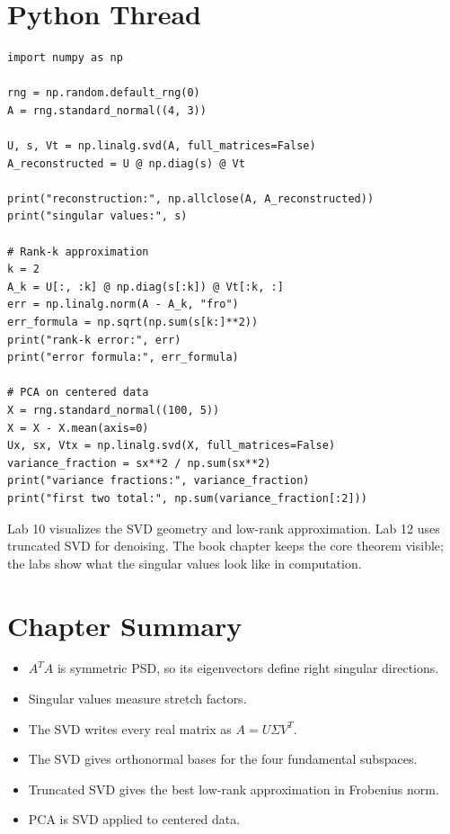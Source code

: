 \section{Python Thread}

\begin{lstlisting}
import numpy as np

rng = np.random.default_rng(0)
A = rng.standard_normal((4, 3))

U, s, Vt = np.linalg.svd(A, full_matrices=False)
A_reconstructed = U @ np.diag(s) @ Vt

print("reconstruction:", np.allclose(A, A_reconstructed))
print("singular values:", s)

# Rank-k approximation
k = 2
A_k = U[:, :k] @ np.diag(s[:k]) @ Vt[:k, :]
err = np.linalg.norm(A - A_k, "fro")
err_formula = np.sqrt(np.sum(s[k:]**2))
print("rank-k error:", err)
print("error formula:", err_formula)

# PCA on centered data
X = rng.standard_normal((100, 5))
X = X - X.mean(axis=0)
Ux, sx, Vtx = np.linalg.svd(X, full_matrices=False)
variance_fraction = sx**2 / np.sum(sx**2)
print("variance fractions:", variance_fraction)
print("first two total:", np.sum(variance_fraction[:2]))
\end{lstlisting}

\begin{labbox}
Lab 10 visualizes the SVD geometry and low-rank approximation. Lab 12 uses
truncated SVD for denoising. The book chapter keeps the core theorem visible;
the labs show what the singular values look like in computation.
\end{labbox}

\section*{Chapter Summary}

\begin{itemize}
  \item $A^TA$ is symmetric PSD, so its eigenvectors define right singular
        directions.
  \item Singular values measure stretch factors.
  \item The SVD writes every real matrix as $A=U\Sigma V^T$.
  \item The SVD gives orthonormal bases for the four fundamental subspaces.
  \item Truncated SVD gives the best low-rank approximation in Frobenius norm.
  \item PCA is SVD applied to centered data.
\end{itemize}


